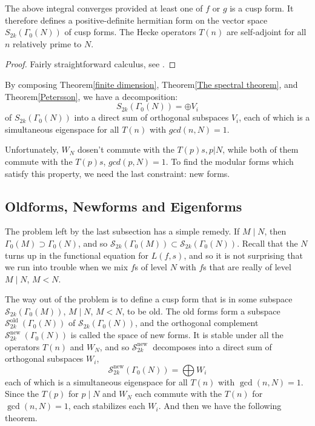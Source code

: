     \begin{theorem}[Petersson]\label{Petersson}
        The above integral converges provided at least one of $f$ or $g$ is a cusp form. It therefore defines a positive-definite hermitian form on the vector space $S_{2k}(\Gamma_0(N))$ of cusp forms. The Hecke operators $T(n)$ are self-adjoint for all $n$ relatively prime to $N$.
    \end{theorem}
    \begin{proof}[Proof]
        Fairly straightforward calculus, see \cite{Kna92}.
    \end{proof}

    \begin{remark}
        By composing Theorem\ref{finite dimension}, Theorem\ref{The spectral theorem}, and Theorem\ref{Petersson}, we have a decomposition:
        $$S_{2k}(\Gamma_0(N))=\oplus V_i $$
        of $S_{2k}(\Gamma_0(N))$ into a direct sum of orthogonal subspaces $V_i$, each of which is a simultaneous eigenspace for all $T(n)$ with $gcd(n, N)=1$.
    \end{remark}

    Unfortunately, $W_N$ dosen't commute with the $T(p)s,p|N$, while both of them  commute with the $T(p)s$, $gcd(p,N)=1$. To find the modular forms which satisfy this property, we need the last constraint: new forms.

    \subsection{Oldforms, Newforms and Eigenforms}

    The problem left by the last subsection has a simple remedy. If  $M \mid N$, then  $\Gamma_{0}(M) \supset \Gamma_{0}(N)$, and so  $\mathcal{S}_{2 k}\left(\Gamma_{0}(M)\right) \subset \mathcal{S}_{2 k}\left(\Gamma_{0}(N)\right) $. Recall that the  $N$  turns up in the functional equation for  $L(f, s)$, and so it is not surprising that we run into trouble when we mix  $f$s of level  $N$  with  $f$s that are really of level  $M \mid N$,  $M<N$. 
    
    The way out of the problem is to define a cusp form that is in some subspace  $\mathcal{S}_{2 k}\left(\Gamma_{0}(M)\right)$, $M \mid N$, $ M<N$, to be old. The old forms form a subspace  $\mathcal{S}_{2 k}^{\text {old }}\left(\Gamma_{0}(N)\right)$  of  $\mathcal{S}_{2 k}\left(\Gamma_{0}(N)\right)$, and the orthogonal complement  $\mathcal{S}_{2 k}^{\text {new }}\left(\Gamma_{0}(N)\right)$  is called the space of new forms. It is stable under all the operators  $T(n)$  and  $W_{N}$, and so  $\mathcal{S}_{2 k}^{\text {new }}$  decomposes into a direct sum of orthogonal subspaces  $W_{i}$, 
    $$\mathcal{S}_{2 k}^{\mathrm{new}}\left(\Gamma_{0}(N)\right)=\bigoplus W_{i}$$ 
    each of which is a simultaneous eigenspace for all  $T(n)$  with  $\operatorname{gcd}(n, N)=1$. Since the  $T(p)$  for  $p \mid N$  and  $W_{N}$  each commute with the  $T(n)$  for  $\operatorname{gcd}(n, N)=  1$, each stabilizes each  $W_{i}$. And then we have the following theorem.

